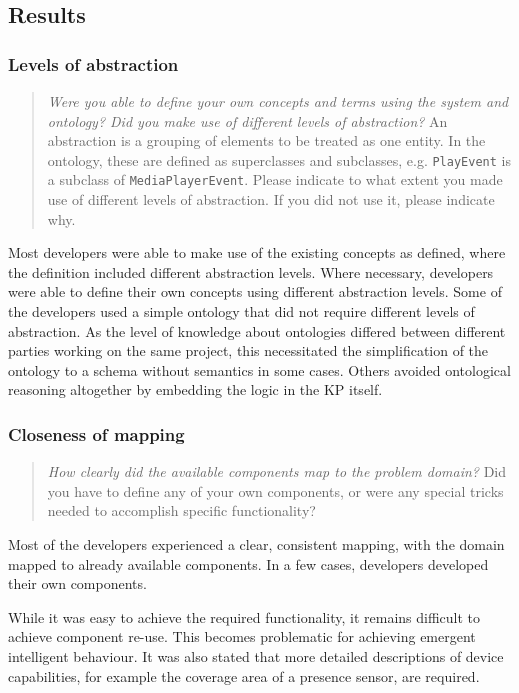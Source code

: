 \subsection{Results}


\subsubsection{Levels of abstraction}
\label{LevelsOfAbstraction}
\begin{quote}
	\emph{Were you able to define your own concepts and terms using the system and ontology? Did you make use of different levels of abstraction?} An abstraction is a grouping of elements to be treated as one entity. In the ontology, these are defined as superclasses and subclasses, e.g. \texttt{PlayEvent} is a subclass of \texttt{MediaPlayerEvent}. Please indicate to what extent you made use of different levels of abstraction. If you did not use it, please indicate why.
\end{quote}

Most developers were able to make use of the existing concepts as defined, where the definition included different abstraction levels. Where necessary, developers were able to define their own concepts using different abstraction levels. Some of the developers used a simple ontology that did not require different levels of abstraction. As the level of knowledge about ontologies differed between different parties working on the same project, this necessitated the simplification of the ontology to a schema without semantics in some cases. Others avoided ontological reasoning altogether by embedding the logic in the \ac{KP} itself.


\subsubsection{Closeness of mapping}
\label{resultsCloseness}

\begin{quote}
	\emph{How clearly did the available components map to the problem domain?}
	Did you have to define any of your own components, or were any special tricks needed to accomplish specific functionality?
\end{quote}


Most of the developers experienced a clear, consistent mapping, with the domain mapped to already available components. In a few cases, developers developed their own components.

While it was easy to achieve the required functionality, it remains difficult to achieve component re-use. This becomes problematic for achieving emergent intelligent behaviour. 
It was also stated that more detailed descriptions of device capabilities, for example the coverage area of a presence sensor, are required.


